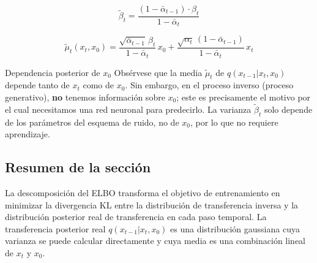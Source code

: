 $$\tilde{\beta}_t = \frac{(1 - \bar{\alpha}_{t-1}) \cdot \beta_t}{1 - \bar{\alpha}_t}$$

$$\tilde{\mu}_t(x_t, x_0) = \frac{\sqrt{\bar{\alpha}_{t-1}}\, \beta_t}{1 - \bar{\alpha}_t}\, x_0 + \frac{\sqrt{\alpha_t}\, (1 - \bar{\alpha}_{t-1})}{1 - \bar{\alpha}_t}\, x_t$$

\begin{warningbox}{Dependencia posterior de $x_0$}
Obsérvese que la media $\tilde{\mu}_t$ de $q(x_{t-1}|x_t, x_0)$ depende tanto de $x_t$ como de $x_0$. Sin embargo, en el proceso inverso (proceso generativo), \textbf{no} tenemos información sobre $x_0$; este es precisamente el motivo por el cual necesitamos una red neuronal para predecirlo. La varianza $\tilde{\beta}_t$ solo depende de los parámetros del esquema de ruido, no de $x_0$, por lo que no requiere aprendizaje.
\end{warningbox}

\subsection{Resumen de la sección}

La descomposición del ELBO transforma el objetivo de entrenamiento en minimizar la divergencia KL entre la distribución de transferencia inversa y la distribución posterior real de transferencia en cada paso temporal. La transferencia posterior real $q(x_{t-1}|x_t, x_0)$ es una distribución gaussiana cuya varianza se puede calcular directamente y cuya media es una combinación lineal de $x_t$ y $x_0$.



